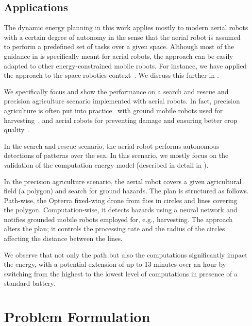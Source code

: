 \subsection{Applications}

The dynamic energy planning in this work applies mostly to modern aerial robots with a certain degree of autonomy in the sense that the aerial robot is assumed to perform a predefined set of tasks over a given space. Although most of the guidance in  is specifically meant for aerial robots, the approach can be easily adapted to other energy-constrained mobile robots. For instance, we have applied the approach to the space robotics context~\citep{seewald2020beyond}. We discuss this further in .

We specifically focus and show the performance on a search and rescue and precision agriculture scenario implemented with aerial robots. In fact, precision agriculture is often put into practice~\citep{hajjaj2014review} with ground mobile robots used for harvesting~\citep{qingchun2012study,dong2011development, de2011design, aljanobi2010setup, li2008analysis, edan2000robotic}, and aerial robots for preventing damage and ensuring better crop quality~\citep{puri2017agriculture, daponte2019review}. 

In the search and rescue scenario, the aerial robot performs autonomous detections of patterns over the sea. In this scenario, we mostly focus on the validation of the computation energy model (described in detail in ).

In the precision agriculture scenario, the aerial robot covers a given agricultural field (a polygon) and search for ground hazards. The plan is structured as follows. Path-wise, the Opterra fixed-wing drone from  flies in circles and lines covering the polygon. Computation-wise, it detects hazards using a neural network and notifies grounded mobile robots employed for, e.g., harvesting. The approach alters the plan; it controls the processing rate and the radius of the circles affecting the distance between the lines. 

We observe that not only the path but also the computations significantly impact the energy, with a potential extension of up to 13 minutes over an hour by switching from the highest to the lowest level of computations in presence of a standard battery.

\section{Problem Formulation}
\label{sec:pb-form}

